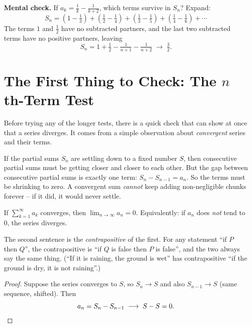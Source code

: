 \begin{recoverybox}
\textbf{Mental check.} If $a_k = \frac{1}{k} - \frac{1}{k+2}$, which terms survive in $S_n$? Expand:
\[
S_n = \left(1 - \tfrac13\right) + \left(\tfrac12 - \tfrac14\right) + \left(\tfrac13 - \tfrac15\right) + \left(\tfrac14 - \tfrac16\right) + \cdots
\]
The terms $1$ and $\frac12$ have no subtracted partners, and the last two subtracted terms have no positive partners, leaving
\[
S_n = 1 + \tfrac12 - \tfrac{1}{n+1} - \tfrac{1}{n+2} \;\longrightarrow\; \tfrac32 .
\]
\end{recoverybox}

\section{The First Thing to Check: The $n$th-Term Test}
\label{ch29:nth-term}

Before trying any of the longer tests, there is a quick check that can show at once that a series diverges. It comes from a simple observation about \emph{convergent} series and their terms.

\begin{intuitionbox}
If the partial sums $S_n$ are settling down to a fixed number $S$, then consecutive partial sums must be getting closer and closer to each other. But the gap between consecutive partial sums is exactly one term: $S_n - S_{n-1} = a_n$. So the terms must be shrinking to zero. A convergent sum \emph{cannot} keep adding non-negligible chunks forever -- if it did, it would never settle.
\end{intuitionbox}

\begin{theorem}
\label{ch29:thm-nth-term}
If $\sum_{k=1}^{\infty} a_k$ converges, then $\lim_{n\to\infty} a_n = 0$. Equivalently: if $a_n$ does \emph{not} tend to $0$, the series diverges.
\end{theorem}

The second sentence is the \emph{contrapositive} of the first. For any statement ``if $P$ then $Q$'', the contrapositive is ``if $Q$ is false then $P$ is false'', and the two always say the same thing. (``If it is raining, the ground is wet'' has contrapositive ``if the ground is dry, it is not raining''.)

\begin{proof}
Suppose the series converges to $S$, so $S_n \to S$ and also $S_{n-1} \to S$ (same sequence, shifted). Then
\[
a_n = S_n - S_{n-1} \;\longrightarrow\; S - S = 0. \qedhere
\]
\end{proof}

